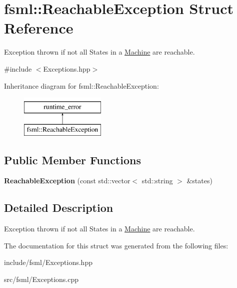 \hypertarget{structfsml_1_1ReachableException}{\section{fsml\-:\-:Reachable\-Exception Struct Reference}
\label{structfsml_1_1ReachableException}
}


Exception thrown if not all States in a \hyperlink{classfsml_1_1Machine}{Machine} are reachable.  




{\ttfamily \#include $<$Exceptions.\-hpp$>$}

Inheritance diagram for fsml\-:\-:Reachable\-Exception\-:\begin{figure}[H]
\begin{center}
\leavevmode
\includegraphics[height=2.000000cm]{structfsml_1_1ReachableException}
\end{center}
\end{figure}
\subsection*{Public Member Functions}
\begin{DoxyCompactItemize}
\item 
\hypertarget{structfsml_1_1ReachableException_ae4196974211a8b011225493b86ed196e}{{\bfseries Reachable\-Exception} (const std\-::vector$<$ std\-::string $>$ \&states)}\label{structfsml_1_1ReachableException_ae4196974211a8b011225493b86ed196e}

\end{DoxyCompactItemize}


\subsection{Detailed Description}
Exception thrown if not all States in a \hyperlink{classfsml_1_1Machine}{Machine} are reachable. 



The documentation for this struct was generated from the following files\-:\begin{DoxyCompactItemize}
\item 
include/fsml/Exceptions.\-hpp\item 
src/fsml/Exceptions.\-cpp\end{DoxyCompactItemize}
